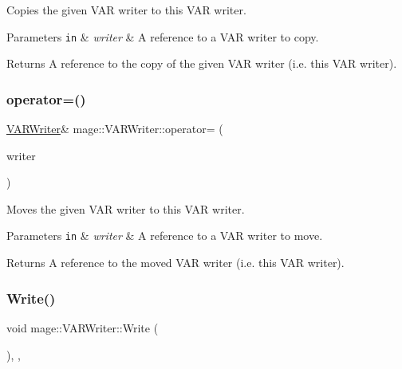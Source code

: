 Copies the given V\+AR writer to this V\+AR writer.


\begin{DoxyParams}[1]{Parameters}
\mbox{\tt in}  & {\em writer} & A reference to a V\+AR writer to copy. \\
\hline
\end{DoxyParams}
\begin{DoxyReturn}{Returns}
A reference to the copy of the given V\+AR writer (i.\+e. this V\+AR writer). 
\end{DoxyReturn}
\hypertarget{classmage_1_1_v_a_r_writer_ad94891c5ead079afd9c2d33dcb3010e1}{}\label{classmage_1_1_v_a_r_writer_ad94891c5ead079afd9c2d33dcb3010e1} 
\subsubsection{\texorpdfstring{operator=()}{operator=()}\hspace{0.1cm}{\footnotesize\ttfamily [2/2]}}
{\footnotesize\ttfamily \hyperlink{classmage_1_1_v_a_r_writer}{V\+A\+R\+Writer}\& mage\+::\+V\+A\+R\+Writer\+::operator= (\begin{DoxyParamCaption}\item[{\hyperlink{classmage_1_1_v_a_r_writer}{V\+A\+R\+Writer} \&\&}]{writer }\end{DoxyParamCaption})\hspace{0.3cm}{\ttfamily [delete]}}

Moves the given V\+AR writer to this V\+AR writer.


\begin{DoxyParams}[1]{Parameters}
\mbox{\tt in}  & {\em writer} & A reference to a V\+AR writer to move. \\
\hline
\end{DoxyParams}
\begin{DoxyReturn}{Returns}
A reference to the moved V\+AR writer (i.\+e. this V\+AR writer). 
\end{DoxyReturn}
\hypertarget{classmage_1_1_v_a_r_writer_a964538c6447af667311276745da93d69}{}\label{classmage_1_1_v_a_r_writer_a964538c6447af667311276745da93d69} 
\subsubsection{\texorpdfstring{Write()}{Write()}}
{\footnotesize\ttfamily void mage\+::\+V\+A\+R\+Writer\+::\+Write (\begin{DoxyParamCaption}{ }\end{DoxyParamCaption})\hspace{0.3cm}{\ttfamily [override]}, {\ttfamily [private]}, {\ttfamily [virtual]}}

